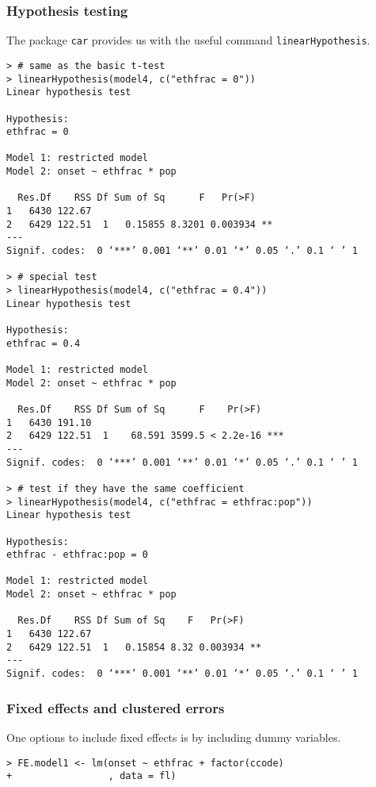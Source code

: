 \subsubsection*{Hypothesis testing}

The package \texttt{car} provides us with the useful command \texttt{linearHypothesis}.

\begin{lstlisting}
> # same as the basic t-test
> linearHypothesis(model4, c("ethfrac = 0"))
Linear hypothesis test

Hypothesis:
ethfrac = 0

Model 1: restricted model
Model 2: onset ~ ethfrac * pop

  Res.Df    RSS Df Sum of Sq      F   Pr(>F)   
1   6430 122.67                                
2   6429 122.51  1   0.15855 8.3201 0.003934 **
---
Signif. codes:  0 ‘***’ 0.001 ‘**’ 0.01 ‘*’ 0.05 ‘.’ 0.1 ‘ ’ 1

> # special test
> linearHypothesis(model4, c("ethfrac = 0.4"))
Linear hypothesis test

Hypothesis:
ethfrac = 0.4

Model 1: restricted model
Model 2: onset ~ ethfrac * pop

  Res.Df    RSS Df Sum of Sq      F    Pr(>F)    
1   6430 191.10                                  
2   6429 122.51  1    68.591 3599.5 < 2.2e-16 ***
---
Signif. codes:  0 ‘***’ 0.001 ‘**’ 0.01 ‘*’ 0.05 ‘.’ 0.1 ‘ ’ 1

> # test if they have the same coefficient
> linearHypothesis(model4, c("ethfrac = ethfrac:pop"))
Linear hypothesis test

Hypothesis:
ethfrac - ethfrac:pop = 0

Model 1: restricted model
Model 2: onset ~ ethfrac * pop

  Res.Df    RSS Df Sum of Sq    F   Pr(>F)   
1   6430 122.67                              
2   6429 122.51  1   0.15854 8.32 0.003934 **
---
Signif. codes:  0 ‘***’ 0.001 ‘**’ 0.01 ‘*’ 0.05 ‘.’ 0.1 ‘ ’ 1
\end{lstlisting}

\subsubsection*{Fixed effects and clustered errors}

One options to include fixed effects is by including dummy variables.

\begin{lstlisting}
> FE.model1 <- lm(onset ~ ethfrac + factor(ccode)
+                 , data = fl)
\end{lstlisting}

